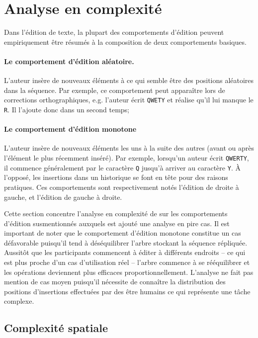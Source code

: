 
\section{Analyse en complexité}
\label{repl:sec:complexity}

Dans l'édition de texte, la plupart des comportements d'édition peuvent
empiriquement être résumés à la composition de deux comportements basiques.

\paragraph{Le comportement d'édition aléatoire.} L'auteur insère de nouveaux
éléments à ce qui semble être des positions aléatoires dans la séquence. Par
exemple, ce comportement peut apparaître lors de corrections orthographiques,
e.g. l'auteur écrit \texttt{QWETY} et réalise qu'il lui manque le \texttt{R}. Il
l'ajoute donc dans un second temps;

\paragraph{Le comportement d'édition monotone} L'auteur insère de nouveaux
éléments les uns à la suite des autres (avant ou après l'élément le plus
récemment inséré). Par exemple, lorsqu'un auteur écrit \texttt{QWERTY}, il
commence généralement par le caractère \texttt{Q} jusqu'à arriver au caractère
\texttt{Y}. À l'opposé, les insertions dans un historique se font en tête pour
des raisons pratiques. Ces comportements sont respectivement notés l'édition de
droite à gauche, et l'édition de gauche à droite.

Cette section concentre l'analyse en complexité de \LSEQ sur les comportements
d'édition susmentionnés auxquels est ajouté une analyse en pire cas. Il est
important de noter que le comportement d'édition monotone constitue un cas
défavorable puisqu'il tend à déséquilibrer l'arbre stockant la séquence
répliquée. Aussitôt que les participants commencent à éditer à différents
endroits -- ce qui est plus proche d'un cas d'utilisation réel -- l'arbre
commence à se rééquilibrer et les opérations deviennent plus efficaces
proportionnellement. L'analyse ne fait pas mention de cas moyen puisqu'il
nécessite de connaître la distribution des positions d'insertions effectuées par
des être humains ce qui représente une tâche complexe.

\subsection{Complexité spatiale}
\label{repl:subsec:space}

